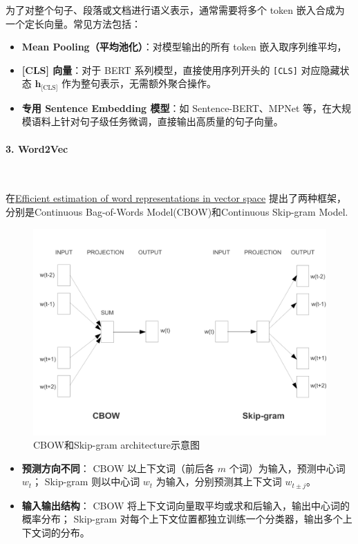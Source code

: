 



为了对整个句子、段落或文档进行语义表示，通常需要将多个 token 嵌入合成为一个定长向量。常见方法包括：
\begin{itemize}
  \item \textbf{Mean Pooling（平均池化）}：对模型输出的所有 token 嵌入取序列维平均，
  \item \textbf{[CLS] 向量}：对于 BERT 系列模型，直接使用序列开头的 \texttt{[CLS]} 对应隐藏状态 \(\mathbf{h}_\text{[CLS]}\) 作为整句表示，无需额外聚合操作。
  \item \textbf{专用 Sentence Embedding 模型}：如 Sentence-BERT、MPNet 等，在大规模语料上针对句子级任务微调，直接输出高质量的句子向量。
\end{itemize}

\paragraph{3. Word2Vec}~{}

在\href{https://arxiv.org/abs/1301.3781}{Efficient estimation of word representations in vector space} 提出了两种框架，分别是Continuous Bag-of-Words Model(CBOW)和Continuous Skip-gram Model. 


\begin{figure}[htbp]
  \centering
  \includegraphics[width=0.5\linewidth]{figs/lec2/lec2.06.pdf}
  \caption{CBOW和Skip-gram architecture示意图}
  \label{fig:Word2Vec}
\end{figure}

\begin{itemize}
  \item \textbf{预测方向不同}：  
    CBOW 以上下文词（前后各 $m$ 个词）为输入，预测中心词 $w_t$；  
    Skip-gram 则以中心词 $w_t$ 为输入，分别预测其上下文词 $w_{t\pm j}$。  
  \item \textbf{输入输出结构}：  
    CBOW 将上下文词向量取平均或求和后输入，输出中心词的概率分布；  
    Skip-gram 对每个上下文位置都独立训练一个分类器，输出多个上下文词的分布。   
\end{itemize}



